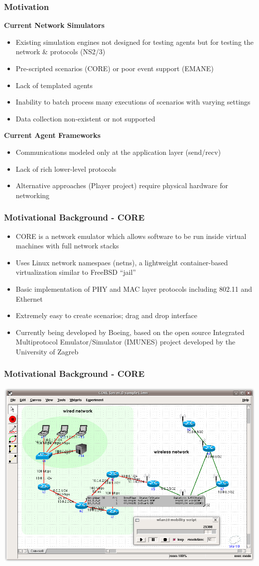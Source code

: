 \documentclass[mathserif]{beamer}
\begin{document}
\frame
{
    \frametitle{Motivation}
    \textbf{Current Network Simulators}
    \begin{itemize}
	\item Existing simulation engines not designed for testing agents but for testing the network \& protocols (NS2/3)
	\item Pre-scripted scenarios (CORE) or poor event support (EMANE)
	\item Lack of templated agents
	\item Inability to batch process many executions of scenarios with varying settings
	\item Data collection non-existent or not supported
    \end{itemize}
    \textbf{Current Agent Frameworks}
    \begin{itemize}
	\item Communications modeled only at the application layer (send/recv)
	\item Lack of rich lower-level protocols
	\item Alternative approaches (Player project) require physical hardware for networking
    \end{itemize}
}

\frame
{
    \frametitle{Motivational Background - CORE}
    \begin{itemize}
	\item CORE is a network emulator which allows software to be run inside virtual machines with full network stacks
	\item Uses Linux network namespaes (netns), a lightweight container-based virtualization similar to FreeBSD ``jail''
	\item Basic implementation of PHY and MAC layer protocols including 802.11 and Ethernet
	\item Extremely easy to create scenarios; drag and drop interface
	\item Currently being developed by Boeing, based on the open source Integrated Multiprotocol Emulator/Simulator (IMUNES) project developed by the University of Zagreb
    \end{itemize}
}

\frame
{
    \frametitle{Motivational Background - CORE}
    \begin{center}
        \includegraphics[scale=.3]{core-screenshot.png}
    \end{center}
}
\end{document}
